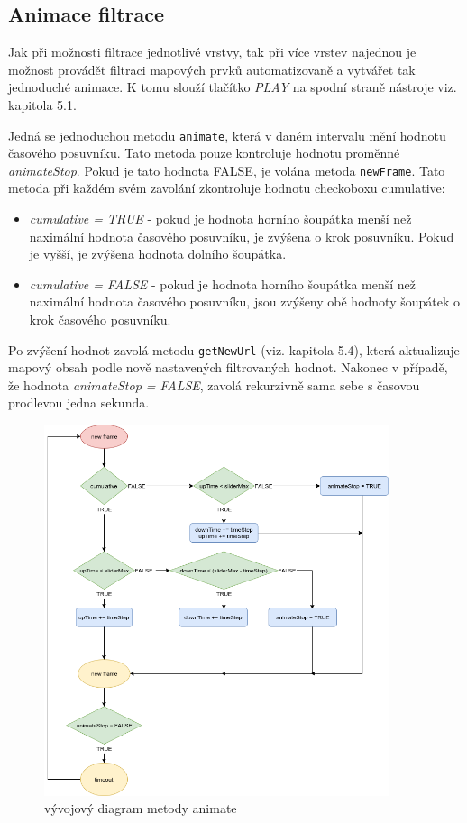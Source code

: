 \subsection{Animace filtrace}

Jak při možnosti filtrace jednotlivé vrstvy, tak při více vrstev najednou je možnost provádět filtraci mapových prvků automatizovaně a vytvářet tak jednoduché animace. K tomu slouží tlačítko \textit{PLAY} na spodní straně nástroje viz. kapitola 5.1.

Jedná se jednoduchou metodu \verb|animate|, která v daném intervalu mění hodnotu časového posuvníku. Tato metoda pouze kontroluje hodnotu proměnné \textit{animateStop}. Pokud je tato hodnota FALSE, je volána metoda \verb|newFrame|. Tato metoda při každém svém zavolání zkontroluje hodnotu checkoboxu cumulative:
\begin{itemize}
	\item\textit{cumulative = TRUE} - pokud je hodnota horního šoupátka menší než naximální hodnota časového posuvníku, je zvýšena o krok posuvníku. Pokud je vyšší, je zvýšena hodnota dolního šoupátka.
	\item\textit{cumulative = FALSE} - pokud je hodnota horního šoupátka menší než naximální hodnota časového posuvníku, jsou zvýšeny obě hodnoty šoupátek o krok časového posuvníku.
\end{itemize}
Po zvýšení hodnot zavolá metodu \verb|getNewUrl| (viz. kapitola 5.4), která aktualizuje mapový obsah podle nově nastavených filtrovaných hodnot. Nakonec v případě, že hodnota \textit{animateStop = FALSE}, zavolá rekurzivně sama sebe s časovou prodlevou jedna sekunda. 

\begin{figure}[h!]
	\centering
	\includegraphics[width=0.9\textwidth]{../img/animate.png}
	\caption{vývojový diagram metody animate}
	\label{fig:animate-chart}
\end{figure}